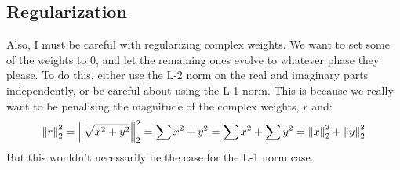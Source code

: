 

\subsection{Regularization}
Also, I must be careful with regularizing complex weights. We want to set some
of the weights to 0, and let the remaining ones evolve to whatever phase they
please. To do this, either use the L-2 norm on the real and imaginary parts
independently, or be careful about using the L-1 norm. This is because we
really want to be penalising the magnitude of the complex weights, $r$ and: 
\begin{equation}
  {\left\lVert r \right\rVert}_{2}^2 = {\left\lVert \sqrt{x^2+y^2} \right\rVert}_{2}^2 = \sum x^2 + y^2 = \sum x^2 + \sum y^2 = {\left\lVert x \right\rVert}_{2}^2 + {\left\lVert y \right\rVert}_{2}^2
\end{equation}
But this wouldn't necessarily be the case for the L-1 norm case.


